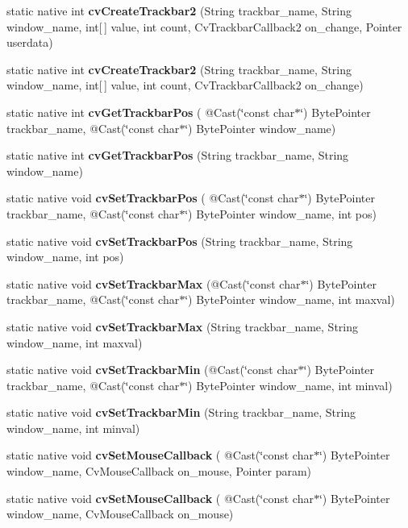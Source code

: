 \begin{DoxyCompactItemize}
static native int {\bfseries cv\+Create\+Trackbar2} (String trackbar\+\_\+name, String window\+\_\+name, int\mbox{[}$\,$\mbox{]} value, int count, Cv\+Trackbar\+Callback2 on\+\_\+change, Pointer userdata)
\item 
static native int {\bfseries cv\+Create\+Trackbar2} (String trackbar\+\_\+name, String window\+\_\+name, int\mbox{[}$\,$\mbox{]} value, int count, Cv\+Trackbar\+Callback2 on\+\_\+change)
\item 
static native int {\bfseries cv\+Get\+Trackbar\+Pos} ( @Cast(\char`\"{}const char$\ast$\char`\"{}) Byte\+Pointer trackbar\+\_\+name, @Cast(\char`\"{}const char$\ast$\char`\"{}) Byte\+Pointer window\+\_\+name)
\item 
static native int {\bfseries cv\+Get\+Trackbar\+Pos} (String trackbar\+\_\+name, String window\+\_\+name)
\item 
static native void {\bfseries cv\+Set\+Trackbar\+Pos} ( @Cast(\char`\"{}const char$\ast$\char`\"{}) Byte\+Pointer trackbar\+\_\+name, @Cast(\char`\"{}const char$\ast$\char`\"{}) Byte\+Pointer window\+\_\+name, int pos)
\item 
static native void {\bfseries cv\+Set\+Trackbar\+Pos} (String trackbar\+\_\+name, String window\+\_\+name, int pos)
\item 
static native void {\bfseries cv\+Set\+Trackbar\+Max} (@Cast(\char`\"{}const char$\ast$\char`\"{}) Byte\+Pointer trackbar\+\_\+name, @Cast(\char`\"{}const char$\ast$\char`\"{}) Byte\+Pointer window\+\_\+name, int maxval)
\item 
static native void {\bfseries cv\+Set\+Trackbar\+Max} (String trackbar\+\_\+name, String window\+\_\+name, int maxval)
\item 
static native void {\bfseries cv\+Set\+Trackbar\+Min} (@Cast(\char`\"{}const char$\ast$\char`\"{}) Byte\+Pointer trackbar\+\_\+name, @Cast(\char`\"{}const char$\ast$\char`\"{}) Byte\+Pointer window\+\_\+name, int minval)
\item 
static native void {\bfseries cv\+Set\+Trackbar\+Min} (String trackbar\+\_\+name, String window\+\_\+name, int minval)
\item 
static native void {\bfseries cv\+Set\+Mouse\+Callback} ( @Cast(\char`\"{}const char$\ast$\char`\"{}) Byte\+Pointer window\+\_\+name, Cv\+Mouse\+Callback on\+\_\+mouse, Pointer param)
\item 
static native void {\bfseries cv\+Set\+Mouse\+Callback} ( @Cast(\char`\"{}const char$\ast$\char`\"{}) Byte\+Pointer window\+\_\+name, Cv\+Mouse\+Callback on\+\_\+mouse)
\item 

\end{DoxyCompactItemize}
